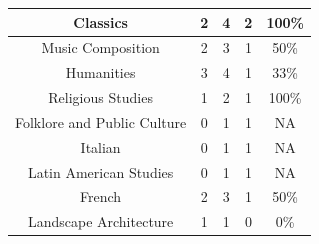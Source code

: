 \documentclass[10pt]{article}
\begin{document}
\begin{longtable}[c]{|ccccc|}
	\multicolumn{1}{|c|}{Classics}                                   & \multicolumn{1}{c|}{2}                               & \multicolumn{1}{c|}{4}                                   & \multicolumn{1}{c|}{2}                  & 100\%                 \\ \hline
	\multicolumn{1}{|c|}{Music Composition}                          & \multicolumn{1}{c|}{2}                               & \multicolumn{1}{c|}{3}                                   & \multicolumn{1}{c|}{1}                  & 50\%                  \\ \hline
	\multicolumn{1}{|c|}{Humanities}                                 & \multicolumn{1}{c|}{3}                               & \multicolumn{1}{c|}{4}                                   & \multicolumn{1}{c|}{1}                  & 33\%                  \\ \hline
	\multicolumn{1}{|c|}{Religious Studies}                          & \multicolumn{1}{c|}{1}                               & \multicolumn{1}{c|}{2}                                   & \multicolumn{1}{c|}{1}                  & 100\%                 \\ \hline
	\multicolumn{1}{|c|}{Folklore and Public Culture}                & \multicolumn{1}{c|}{0}                               & \multicolumn{1}{c|}{1}                                   & \multicolumn{1}{c|}{1}                  & NA                    \\ \hline
	\multicolumn{1}{|c|}{Italian}                                    & \multicolumn{1}{c|}{0}                               & \multicolumn{1}{c|}{1}                                   & \multicolumn{1}{c|}{1}                  & NA                    \\ \hline
	\multicolumn{1}{|c|}{Latin American Studies}                     & \multicolumn{1}{c|}{0}                               & \multicolumn{1}{c|}{1}                                   & \multicolumn{1}{c|}{1}                  & NA                    \\ \hline
	\multicolumn{1}{|c|}{French}                                     & \multicolumn{1}{c|}{2}                               & \multicolumn{1}{c|}{3}                                   & \multicolumn{1}{c|}{1}                  & 50\%                  \\ \hline
	\multicolumn{1}{|c|}{Landscape Architecture}                     & \multicolumn{1}{c|}{1}                               & \multicolumn{1}{c|}{1}                                   & \multicolumn{1}{c|}{0}                  & 0\%                   \\ \hline

\end{longtable}
\end{document}
